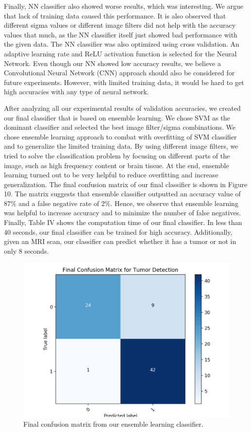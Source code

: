 \documentclass[conference]{IEEEtran}
\begin{document}
Finally, NN classifier also showed worse results, which was interesting. We argue that lack of training data caused this performance. It is also observed that different sigma values or different image filters did not help with the accuracy values that much, as the NN classifier itself just showed bad performance with the given data. The NN classifier was also optimized using cross validation. An adaptive learning rate and ReLU activation function is selected for the Neural Network. Even though our NN showed low accuracy results, we believe a Convolutional Neural Network (CNN) approach should also be considered for future experiments. However, with limited training data, it would be hard to get high accuracies with any type of neural network.  

After analyzing all our experimental results of validation accuracies, we created our final classifier that is based on ensemble learning. We chose SVM as the dominant classifier and selected the best image filter/sigma combinations. We chose ensemble learning approach to combat with overfitting of SVM classifier and to generalize the limited training data. By using different image filters, we tried to solve the classification problem by focusing on different parts of the image, such as high frequency content or brain tissue. At the end, ensemble learning turned out to be very helpful to reduce overfitting and increase generalization. The final confusion matrix of our final classifier is shown in Figure 10. The matrix suggests that ensemble classifier outputted an accuracy value of 87\% and a false negative rate of 2\%. Hence, we observe that ensemble learning was helpful to increase accuracy and to minimize the number of false negatives. Finally, Table IV shows the computation time of our final classifier. In less than 40 seconds, our final classifier can be trained for high accuracy. Additionally, given an MRI scan, our classifier can predict whether it has a tumor or not in only 8 seconds. 

\begin{figure}[h]
\centering
\includegraphics[scale=0.35]{final_confusion_matrix}
\caption{Final confusion matrix from our ensemble learning classifier.}
\end{figure}
\end{document}
